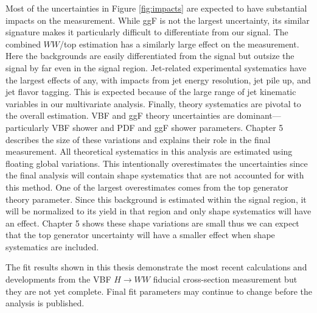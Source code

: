 Most of the uncertainties in Figure \ref{fig:impacts} are expected to have substantial impacts on the measurement. While ggF is not the largest uncertainty, its similar signature makes it particularly difficult to differentiate from our signal. The combined $WW$/top estimation has a similarly 
large effect on the measurement. Here the backgrounds are easily differentiated from the signal but outsize the signal by far even in the signal region. Jet-related experimental systematics have the largest effects of any, with impacts from jet energy resolution, jet pile up, and jet flavor tagging. This is expected because of the large range of jet kinematic variables in our multivariate analysis. Finally, theory systematics are pivotal to the overall estimation. VBF and ggF theory uncertainties are dominant---particularly VBF shower and PDF and ggF shower parameters. Chapter 5 describes the size of these variations and explains their role in the final measurement. All theoretical systematics in this analysis are estimated using floating global variations. This intentionally overestimates the uncertainties since the final analysis will contain shape systematics that are not accounted for with this method. One of the largest overestimates comes from the top generator theory parameter. Since this background is estimated within the signal region, it will be normalized to its yield in that region and only shape systematics will have an effect. Chapter 5 shows these shape variations are small thus we can expect that the top generator uncertainty will have a smaller effect when shape systematics are included. 

The fit results shown in this thesis demonstrate the most recent calculations and developments from the VBF $H\rightarrow WW$ fiducial cross-section measurement but they are not yet complete. Final fit parameters may continue to change before the analysis is published. 

